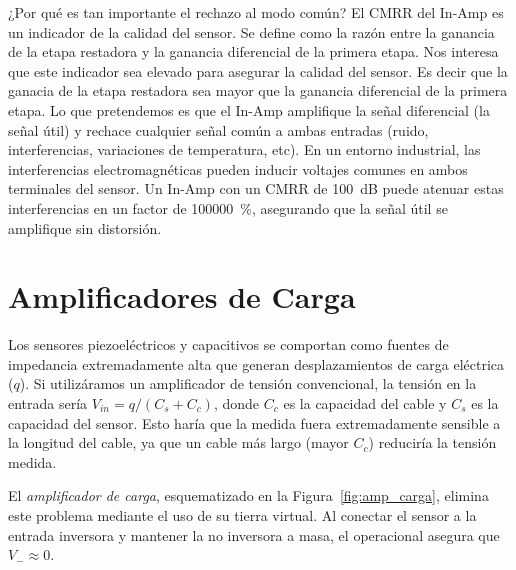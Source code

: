 ¿Por qué es tan importante el rechazo al modo común? El CMRR del In-Amp es un indicador de la calidad del sensor. Se define como la razón entre la ganancia de la etapa restadora y la ganancia diferencial de la primera etapa. Nos interesa que este indicador sea elevado para asegurar la calidad del sensor. Es decir que la ganacia de la etapa restadora sea mayor que la ganancia diferencial de la primera etapa. Lo que pretendemos es que el In-Amp amplifique la señal diferencial (la señal útil) y rechace cualquier señal común a ambas entradas (ruido, interferencias, variaciones de temperatura, etc). En un entorno industrial, las interferencias electromagnéticas pueden inducir voltajes comunes en ambos terminales del sensor. Un In-Amp con un CMRR de \qty{100}{dB} puede atenuar estas interferencias en un factor de \qty{100000}{\%}, asegurando que la señal útil se amplifique sin distorsión. 




\section{Amplificadores de Carga}\label{sec:amp_carga}

Los sensores piezoeléctricos y capacitivos se comportan como fuentes de impedancia extremadamente alta que generan desplazamientos de carga eléctrica ($q$). Si utilizáramos un amplificador de tensión convencional, la tensión en la entrada sería $V_{in} = q / (C_s + C_c)$, donde $C_c$ es la capacidad del cable y $C_s$ es la capacidad del sensor. Esto haría que la medida fuera extremadamente sensible a la longitud del cable, ya que un cable más largo (mayor $C_c$) reduciría la tensión medida.

El \emph{amplificador de carga}, esquematizado en la Figura~\ref{fig:amp_carga}, elimina este problema mediante el uso de su tierra virtual. Al conectar el sensor a la entrada inversora y mantener la no inversora a masa, el operacional asegura que $V_- \approx 0$. 



